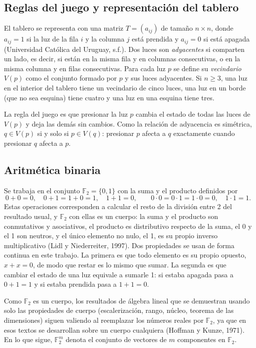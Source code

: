 \documentclass[12pt,a4paper]{article}
\theoremstyle{plain}
\theoremstyle{definition}
\theoremstyle{remark}
\newcommand{\F}{\mathbb{F}_2}
\newcommand{\V}{V}
\begin{document}
\subsection{Reglas del juego y representación del tablero}

El tablero se representa con una matriz $T=(a_{ij})$ de tamaño $n\times n$, donde $a_{ij}=1$ si la luz de la fila $i$ y la columna $j$ está prendida y $a_{ij}=0$ si está apagada (Universidad Católica del Uruguay, s.f.). Dos luces son \textit{adyacentes} si comparten un lado, es decir, si están en la misma fila y en columnas consecutivas, o en la misma columna y en filas consecutivas. Para cada luz $p$ se define su \textit{vecindario} $\V(p)$ como el conjunto formado por $p$ y sus luces adyacentes. Si $n\geq 3$, una luz en el interior del tablero tiene un vecindario de cinco luces, una luz en un borde (que no sea esquina) tiene cuatro y una luz en una esquina tiene tres.

La regla del juego es que presionar la luz $p$ cambia el estado de todas las luces de $\V(p)$ y deja las demás sin cambios. Como la relación de adyacencia es simétrica, $q\in\V(p)$ si y solo si $p\in\V(q)$: presionar $p$ afecta a $q$ exactamente cuando presionar $q$ afecta a $p$.

\subsection{Aritmética binaria}

Se trabaja en el conjunto $\F=\{0,1\}$ con la suma y el producto definidos por
\[
0+0=0,\quad 0+1=1+0=1,\quad 1+1=0,\qquad 0\cdot 0=0\cdot 1=1\cdot 0=0,\quad 1\cdot 1=1.
\]
Estas operaciones corresponden a calcular el resto de la división entre 2 del resultado usual, y $\F$ con ellas es un cuerpo: la suma y el producto son conmutativos y asociativos, el producto es distributivo respecto de la suma, el 0 y el 1 son neutros, y el único elemento no nulo, el 1, es su propio inverso multiplicativo (Lidl y Niederreiter, 1997). Dos propiedades se usan de forma continua en este trabajo. La primera es que todo elemento es su propio opuesto, $x+x=0$, de modo que restar es lo mismo que sumar. La segunda es que cambiar el estado de una luz equivale a sumarle 1: si estaba apagada pasa a $0+1=1$ y si estaba prendida pasa a $1+1=0$.

Como $\F$ es un cuerpo, los resultados de álgebra lineal que se demuestran usando solo las propiedades de cuerpo (escalerización, rango, núcleo, teorema de las dimensiones) siguen valiendo al reemplazar los números reales por $\F$, ya que en esos textos se desarrollan sobre un cuerpo cualquiera (Hoffman y Kunze, 1971). En lo que sigue, $\F^m$ denota el conjunto de vectores de $m$ componentes en $\F$.
\end{document}
